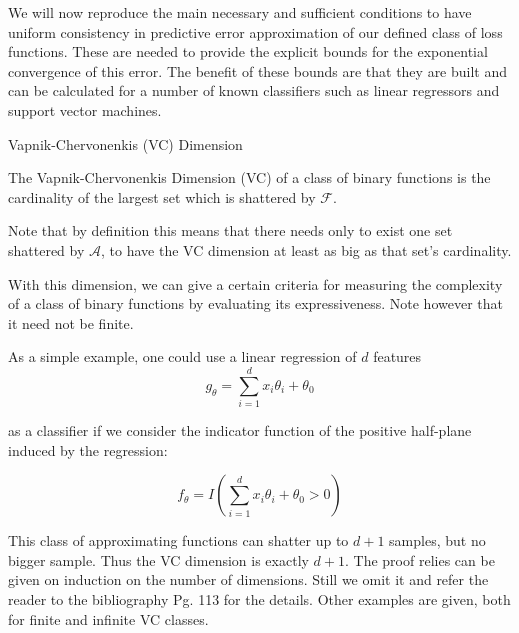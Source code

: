 We will now reproduce the main necessary and sufficient conditions to have uniform consistency in predictive error approximation of our defined class of loss functions.
These are needed to provide the explicit bounds for the exponential convergence of this error.
The benefit of these bounds are that they are built and can be calculated for a number of known classifiers such as linear regressors and support vector machines.


\begin{definition}{Vapnik-Chervonenkis (VC) Dimension}

The Vapnik-Chervonenkis Dimension (VC) of a class of binary functions is the cardinality of the largest set which is shattered by $\mathcal {F}$.
\end{definition}

Note that by definition this means that there needs only to exist one set shattered by $\mathcal {A}$, to have the VC dimension at least as big as that set's cardinality.

With this dimension, we can give a certain criteria for measuring the complexity of a class of binary functions by evaluating its expressiveness.
Note however that it need not be finite.

As a simple example, one could use a linear regression of $d$ features
\begin{equation}
g_{\theta} = \sum_{i=1}^d x_i \theta_i + \theta_0
\end{equation}

 as a classifier if we consider the indicator function of the positive half-plane induced by the regression:

\begin{equation}
f_{\theta} = I(\sum_{i=1}^d x_i \theta_i + \theta_0 > 0)
\end{equation}

This class of approximating functions can shatter up to $d+1$ samples, but no bigger sample.
Thus the VC dimension is exactly $d+1$.
The proof relies can be given on induction on the number of dimensions. 
Still we omit it and refer the reader to the bibliography \textcite{cherkassky-learning2007} Pg.
113 for the details. 
Other examples are given, both for finite and infinite VC classes.


